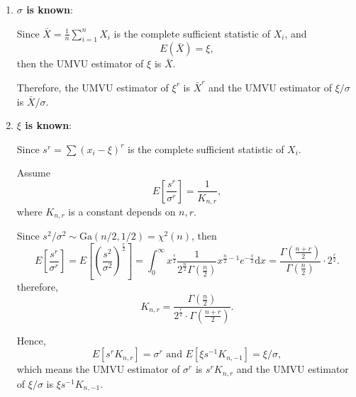 \begin{solution}
    \begin{enumerate}
        \item \textbf{$\sigma$ is known}:

              Since $\bar{X}=\frac{1}{n}\sum_{i=1}^{n}X_i$ is the complete sufficient statistic of $X_i$, and
              \begin{equation*}
                  E(\bar{X})=\xi,
              \end{equation*}
              then the UMVU estimator of $\xi$ is $\bar{X}$.

              Therefore, the UMVU estimator of $\xi^r$ is $\bar{X}^r$ and the UMVU estimator of $\xi/\sigma$ is $\bar{X}/\sigma$.

        \item \textbf{$\xi$ is known}:

              Since $s^r=\sum\left(x_{i}-\xi\right)^r$ is the complete sufficient statistic of $X_i$.

              Assume
              \begin{equation*}
                  E\left[\frac{s^r}{\sigma^r}\right]=\frac{1}{K_{n,r}},
              \end{equation*}
              where $K_{n,r}$ is a constant depends on $n,r$.

              Since $s^2/\sigma^2\sim\text{Ga}(n/2,1/2)=\chi^2(n)$, then
              \begin{equation*}
                  E\left[\frac{s^r}{\sigma^r}\right]=E\left[\left(\frac{s^2}{\sigma^2}\right)^{\frac{r}{2}}\right]=\int_{0}^{\infty}x^{\frac{r}{2}}\frac{1}{2^{\frac{n}{2}}\Gamma(\frac{n}{2})}x^{\frac{n}{2}-1}e^{-\frac{x}{2}}\mathrm{d}x=\frac{\Gamma\left(\frac{n+r}{2}\right)}{\Gamma(\frac{n}{2})}\cdot 2^{\frac{r}{2}}.
              \end{equation*}
              therefore,
              \begin{equation*}
                  K_{n,r}=\frac{\Gamma(\frac{n}{2})}{2^{\frac{r}{2}}\cdot\Gamma\left(\frac{n+r}{2}\right)}.
              \end{equation*}

              Hence,
              \begin{equation*}
                  E\left[s^rK_{n,r}\right]=\sigma^r \text{ and } E[\xi s^{-1}K_{n,-1}]=\xi/\sigma,
              \end{equation*}
              which means the UMVU estimator of $\sigma^r$ is $s^rK_{n,r}$ and the UMVU estimator of $\xi/\sigma$ is $\xi s^{-1}K_{n,-1}$.


\end{enumerate}
\end{solution}
